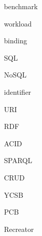 benchmark

workload

binding

SQL

NoSQL

identifier

URI

RDF

ACID

SPARQL

CRUD

YCSB

PCB

Recreator
